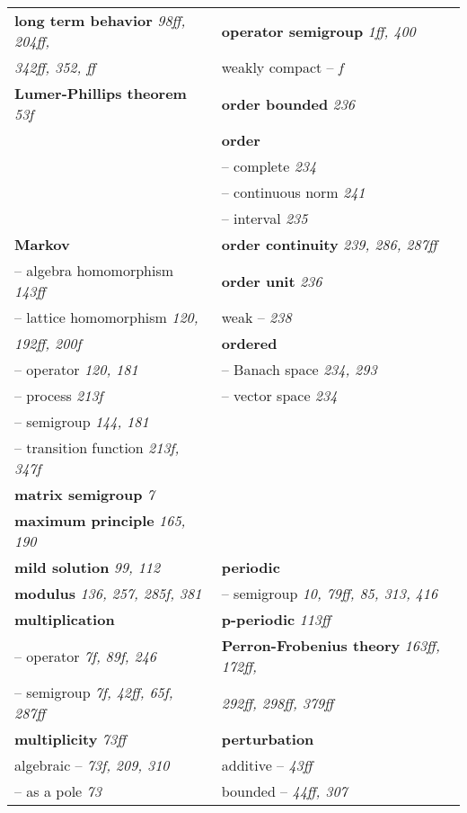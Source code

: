 \begin{longtable}{p{}p{}}
\textbf{long term behavior} \textit{98ff, 204ff,} & \textbf{operator semigroup} \textit{1ff, 400} \\
\quad \textit{342ff, 352, ff} & \quad weakly compact -- \textit{f} \\
\textbf{Lumer-Phillips theorem} \textit{53f} & \textbf{order bounded} \textit{236} \\
& \textbf{order} \\
& \quad -- complete \textit{234} \\
& \quad -- continuous norm \textit{241} \\
& \quad -- interval \textit{235} \\
\textbf{Markov} & \textbf{order continuity} \textit{239, 286, 287ff} \\
\quad -- algebra homomorphism \textit{143ff} & \textbf{order unit} \textit{236} \\
\quad -- lattice homomorphism \textit{120,} & \quad weak -- \textit{238} \\
\quad\quad \textit{192ff, 200f} & \textbf{ordered} \\
\quad -- operator \textit{120, 181} & \quad -- Banach space \textit{234, 293} \\
\quad -- process \textit{213f} & \quad -- vector space \textit{234} \\
\quad -- semigroup \textit{144, 181} & \\
\quad -- transition function \textit{213f, 347f} & \\
\textbf{matrix semigroup} \textit{7} & \\
\textbf{maximum principle} \textit{165, 190} & \\
\textbf{mild solution} \textit{99, 112} & \textbf{periodic} \\
\textbf{modulus} \textit{136, 257, 285f, 381} & \quad -- semigroup \textit{10, 79ff, 85, 313, 416} \\
\textbf{multiplication} & \textbf{p-periodic} \textit{113ff} \\
\quad -- operator \textit{7f, 89f, 246} & \textbf{Perron-Frobenius theory} \textit{163ff, 172ff,} \\
\quad -- semigroup \textit{7f, 42ff, 65f, 287ff} & \quad \textit{292ff, 298ff, 379ff} \\
\textbf{multiplicity} \textit{73ff} & \textbf{perturbation} \\
\quad algebraic -- \textit{73f, 209, 310} & \quad additive -- \textit{43ff} \\
\quad -- as a pole \textit{73} & \quad bounded -- \textit{44ff, 307} \\

\end{longtable}
